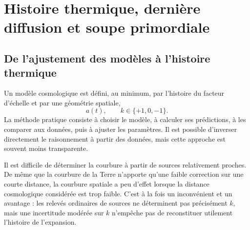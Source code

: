 \chapter{Histoire thermique, dernière diffusion et soupe primordiale}


\section{De l’ajustement des modèles à l’histoire thermique}

Un modèle cosmologique est défini, au minimum, par l’histoire du facteur d’échelle et par une géométrie spatiale,
\begin{equation}
a(t),
\qquad
k\in\{+1,0,-1\}.
\end{equation}
La méthode pratique consiste à choisir le modèle, à calculer ses prédictions, à les comparer aux données, puis à ajuster les paramètres. Il est possible d’inverser directement le raisonnement à partir des données, mais cette approche est souvent moins transparente.

Il est difficile de déterminer la courbure à partir de sources relativement proches. De même que la courbure de la Terre n’apporte qu’une faible correction sur une courte distance, la courbure spatiale a peu d’effet lorsque la distance cosmologique considérée est trop faible. C’est à la fois un inconvénient et un avantage : les relevés ordinaires de sources ne déterminent pas précisément \(k\), mais une incertitude modérée sur \(k\) n’empêche pas de reconstituer utilement l’histoire de l’expansion.

